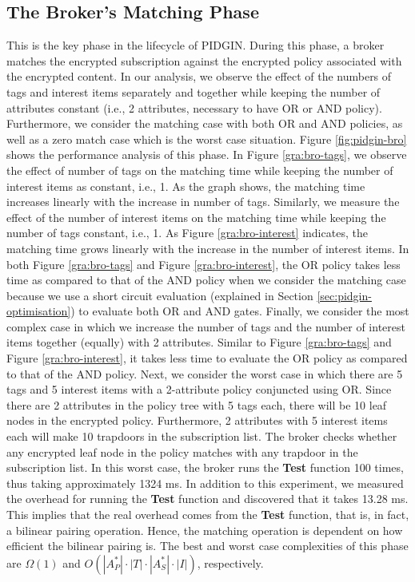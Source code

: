 \documentclass[epsfig,a4paper,11pt,titlepage]{book}
\numberwithin{algorithm}{chapter}
\begin{document}
\subsection{The Broker's Matching Phase}
This is the key phase in the lifecycle of \gls{PIDGIN}. During this phase, a broker matches the encrypted subscription against the encrypted policy associated with the encrypted content. In our analysis, we observe the effect of the numbers of tags and interest items separately and together while keeping the number of attributes constant (i.e., 2 attributes, necessary to have OR or AND policy). Furthermore, we consider the matching case with both OR and AND policies, as well as a zero match case which is the worst case situation. Figure \ref{fig:pidgin-bro} shows the performance analysis of this phase. In Figure \ref{gra:bro-tags}, we observe the effect of number of tags on the matching time while keeping the number of interest items as constant, i.e., 1. As the graph shows, the matching time increases linearly with the increase in number of tags. Similarly, we measure the effect of the number of interest items on the matching time while keeping the number of tags constant, i.e., 1. As Figure \ref{gra:bro-interest} indicates, the matching time grows linearly with the increase in the number of interest items. In both Figure \ref{gra:bro-tags} and Figure \ref{gra:bro-interest}, the OR policy takes less time as compared to that of the AND policy when we consider the matching case because we use a short circuit evaluation (explained in Section \ref{sec:pidgin-optimisation}) to evaluate both OR and AND gates. Finally, we consider the most complex case in which we increase the number of tags and the number of interest items together (equally) with 2 attributes. Similar to Figure \ref{gra:bro-tags} and Figure \ref{gra:bro-interest}, it takes less time to evaluate the OR policy as compared to that of the AND policy. Next, we consider the worst case in which there are 5 tags and 5 interest items with a 2-attribute policy conjuncted using OR. Since there are 2 attributes in the policy tree with 5 tags each, there will be 10 leaf nodes in the encrypted policy. Furthermore, 2 attributes with 5 interest items each will make 10 trapdoors in the subscription list. The broker checks whether any encrypted leaf node in the policy matches with any trapdoor in the subscription list. In this worst case, the broker runs the \textbf{Test} function 100 times, thus taking approximately 1324 \gls{ms}. In addition to this experiment, we measured the overhead for running the \textbf{Test} function and discovered that it takes 13.28 \gls{ms}. This implies that the real overhead comes from the \textbf{Test} function, that is, in fact, a bilinear pairing operation. Hence, the matching operation is dependent on how efficient the bilinear pairing is. The best and worst case complexities of this phase are ${\Omega}(1)$ and $O(|A_P^*| \cdot |T| \cdot |A_S^*| \cdot |I|)$, respectively.
\end{document}

